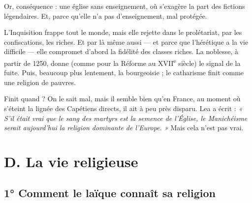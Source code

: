 \documentclass[french,twoside]{book} %
\begin{document}
Or, conséquence : une église sans enseignement, où s’exagère la part des fictions légendaires. Et, parce qu’elle n’a pas d’enseignement, mal protégée.\par
L’Inquisition frappe tout le monde, mais elle rejette dans le prolétariat, par les confiscations, les riches. Et par là même aussi — et parce que l’hérétique a la vie difficile — elle compromet d’abord la fidélité des classes riches. La noblesse, à partir de 1250, donne (comme pour la Réforme au XVII\textsuperscript{e} siècle) le signal de la fuite. Puis, beaucoup plus lentement, la bourgeoisie ; le catharisme finit comme une religion de pauvres.\par
Finit quand ? On le sait mal, mais il semble bien qu’en France, au moment où s’éteint la lignée des Capétiens directs, il ait à peu près disparu. Lea a écrit : \emph{« S’il était vrai que le sang des martyrs est la semence de l’Église, le Manichéisme serait aujourd’hui la religion dominante de l’Europe. »} Mais cela n’est pas vrai.
\label{p109}\section[D. La vie religieuse]{D. La vie religieuse}
\label{c10d}
\subsection[1° Comment le laïque connaît sa religion]{1° Comment le laïque connaît sa religion}
\end{document}
